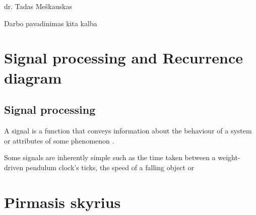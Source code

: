 \documentclass[a4paper,12pt,fleqn]{article}
\begin{document}
  {}{}{}{}%
  {dr. Tadas Meškauskas}

\tableofcontents



\bothabstracts{}%
{Darbo pavadinimas kita kalba} %
{}%






\newpage

\section{Signal processing and Recurrence diagram}
\label{sec:motivation}
\subsection{Signal processing}
A signal is a function that conveys information about the behaviour of a system
or attributes of some phenomenon \cite{priemer1990introductory}.

Some signals are inherently simple such as the time taken 
between a weight-driven pendulum clock's ticks, the speed of
a falling object or 




%
%


\section{Pirmasis skyrius}
\label{sec:motivation}
\end{document}
